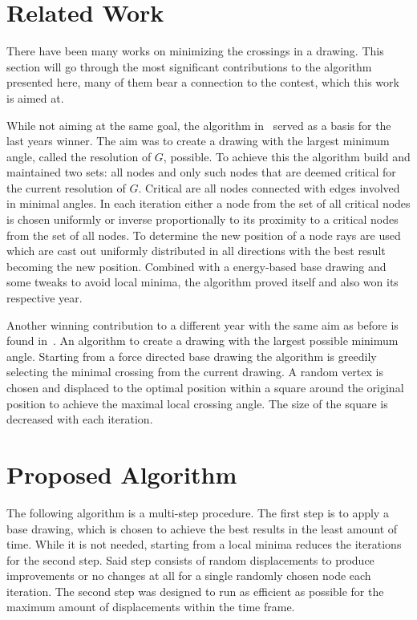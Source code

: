 \documentclass[]{llncs}
\begin{document}
	\section{Related Work}
    There have been many works on minimizing the crossings in a drawing. This section will go through the most significant contributions to the algorithm presented here, many of them bear a connection to the contest, which this work is aimed at.

	While not aiming at the same goal, the algorithm in~\cite{journals/corr/abs-1808-10519} served as a basis for the last years winner. The aim was to create a drawing with the largest minimum angle, called the resolution of $G$,  possible. To achieve this the algorithm build and maintained two sets: all nodes and only such nodes that are deemed critical for the current resolution of $G$. Critical are all nodes connected with edges involved in minimal angles. In each iteration either a node from the set of all critical nodes is chosen uniformly or inverse proportionally to its proximity to a critical nodes from the set of all nodes. To determine the new position of a node rays are used which are cast out uniformly distributed in all directions with the best result becoming the new position. Combined with a energy-based base drawing and some tweaks to avoid local minima, the algorithm proved itself and also won its respective year.

	Another winning contribution to a different year with the same aim as before is found in~\cite{conf/gd/DemelDMRW18}. An algorithm to create a drawing with the largest possible minimum angle. Starting from a force directed base drawing the algorithm is greedily selecting the minimal crossing from the current drawing. A random vertex is chosen and displaced to the optimal position within a square around the original position to achieve the maximal local crossing angle. The size of the square is decreased with each iteration.

    \section {Proposed Algorithm}
	The following algorithm is a multi-step procedure. The first step is to apply a base drawing, which is chosen to achieve the best results in the least amount of time. While it is not needed, starting from a local minima reduces the iterations for the second step. Said step consists of random displacements to produce improvements or no changes at all for a single randomly chosen node each iteration. The second step was designed to run as efficient as possible for the maximum amount of displacements within the time frame.
\end{document}
